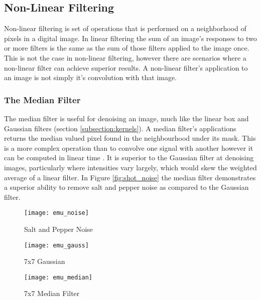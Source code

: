 \subsection{Non-Linear Filtering}

Non-linear filtering is set of operations that is performed on a neighborhood of pixels in a digital image. In linear filtering the sum of an image's responses to two or more filters is the same as the sum of those filters applied to the image once. This is not the case in non-linear filtering, however there are scenarios where a non-linear filter can achieve superior results. A non-linear filter's application to an image is not simply it's convolution with that image.

\subsubsection{The Median Filter}
\label{subsubsection:median_filter}
The median filter is useful for denoising an image, much like the linear box and Gaussian filters (section \ref{subsection:kernels}). A median filter's applications returns the median valued pixel found in the neighbourhood under its mask. This is a more complex operation than to convolve one signal with another however it can be computed in linear time \cite{cormen_2001}. It is superior to the Gaussian filter at denoising images, particularly where intensities vary largely, which would skew the weighted average of a linear filter. In Figure \ref{fig:shot_noise} the median filter demonstrates a superior ability to remove salt and pepper noise as compared to the Gaussian filter.

\begin{figure*}[htbp]
    \centering 
    \begin{subfigure}[b]{0.3\textwidth}
        \texttt{[image: emu\_noise]}
        \caption{Salt and Pepper Noise}
        \label{fig:emu_noise}
    \end{subfigure}
    \begin{subfigure}[b]{0.3\textwidth}
        \texttt{[image: emu\_gauss]}
        \caption{7x7 Gaussian}
        \label{fig:emu_gauss}
    \end{subfigure}
    \begin{subfigure}[b]{0.3\textwidth}
        \texttt{[image: emu\_median]}
        \caption{7x7 Median Filter}
        \label{fig:emu_median}
    \end{subfigure}
    \captionsetup{format=hang}
    \caption{Filtering out salt and pepper noise with Gaussian and median filter. Original image by Grant Durr.}
    \label{fig:shot_noise}
\end{figure*}

